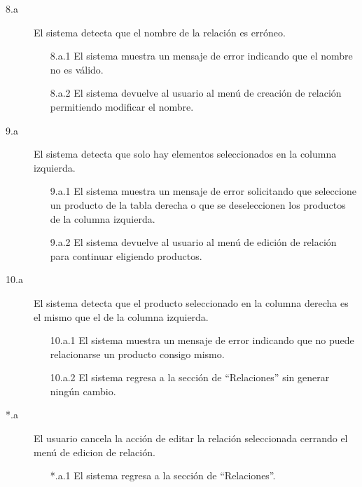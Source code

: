 \begin{description}
    
    \item[8.a] El sistema detecta que el nombre de la relación es erróneo.
    \begin{enumerate}
        \item[8.a.1] El sistema muestra un mensaje de error indicando que el nombre no es válido.
        \item[8.a.2] El sistema devuelve al usuario al menú de creación de relación permitiendo modificar el nombre.
    \end{enumerate}
    
    \item[9.a] El sistema detecta que solo hay elementos seleccionados en la columna izquierda.
    \begin{enumerate}
        \item[9.a.1] El sistema muestra un mensaje de error solicitando que seleccione un producto de la tabla derecha o que se deseleccionen los productos de la columna izquierda.
        \item[9.a.2] El sistema devuelve al usuario al menú de edición de relación para continuar eligiendo productos.
    \end{enumerate}

    \item[10.a] El sistema detecta que el producto seleccionado en la columna derecha es el mismo que el de la columna izquierda.
    \begin{enumerate}
        \item [10.a.1] El sistema muestra un mensaje de error indicando que no puede relacionarse un producto consigo mismo.
        \item [10.a.2] El sistema regresa a la sección de \enquote{Relaciones} sin generar ningún cambio.
    \end{enumerate}

    \item[*.a] El usuario cancela la acción de editar la relación seleccionada cerrando el menú de edicion de relación.
    \begin{enumerate}
        \item[*.a.1] El sistema regresa a la sección de \enquote{Relaciones}.
    \end{enumerate}
\end{description}

